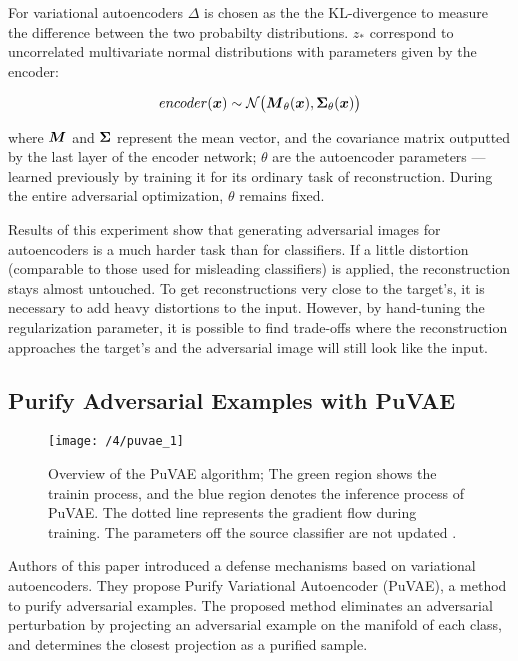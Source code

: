 For variational autoencoders $\Delta$ is chosen as the the KL-divergence to
measure the difference between the two probabilty distributions. $z_{*}$
correspond to uncorrelated multivariate normal distributions with parameters
given by the encoder:

\begin{equation}
    encoder(\boldsymbol{x}) \sim \mathcal{N}\big(\boldsymbol{M}_{\theta}(\boldsymbol{x}), \boldsymbol{\Sigma}_{\theta}(\boldsymbol{x})\big)
\end{equation}

where $\boldsymbol{M}$ and $\boldsymbol{\Sigma}$ represent the mean vector, and the
covariance matrix outputted by the last layer of the encoder network; $\theta$
are the autoencoder parameters \---- learned previously by training it for its
ordinary task of reconstruction. During the entire adversarial optimization,
$\theta$ remains fixed.

Results of this experiment show that generating adversarial images for
autoencoders is a much harder task than for classifiers. If a little distortion
(comparable to those used for misleading classifiers) is applied, the
reconstruction stays almost untouched. To get reconstructions very close to the
target's, it is necessary to add heavy distortions to the input. However, by
hand-tuning the regularization parameter, it is possible to find trade-offs
where the reconstruction approaches the target's and the adversarial image will
still look like the input.

\subsection{Purify Adversarial Examples with PuVAE}
\begin{figure}
	\centering
	\texttt{[image: /4/puvae\_1]}
    \caption{Overview of the PuVAE algorithm; The green region shows the trainin
    process, and the blue region denotes the inference process of PuVAE. The
    dotted line represents the gradient flow during training. The parameters off
    the source classifier are not updated \cite{hwang2019puvae}.} 
	\label{fig:puvae_1}
\end{figure}

Authors of this paper \cite{hwang2019puvae} introduced a defense mechanisms
based on variational autoencoders. They propose Purify Variational Autoencoder
(PuVAE), a method to purify adversarial examples. The proposed method eliminates
an adversarial perturbation by projecting an adversarial example on the manifold
of each class, and determines the closest projection as a purified sample.

